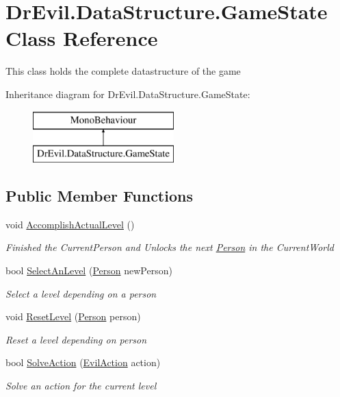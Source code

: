 \hypertarget{class_dr_evil_1_1_data_structure_1_1_game_state}{}\section{Dr\+Evil.\+Data\+Structure.\+Game\+State Class Reference}
\label{class_dr_evil_1_1_data_structure_1_1_game_state}


This class holds the complete datastructure of the game  


Inheritance diagram for Dr\+Evil.\+Data\+Structure.\+Game\+State\+:\begin{figure}[H]
\begin{center}
\leavevmode
\includegraphics[height=2.000000cm]{class_dr_evil_1_1_data_structure_1_1_game_state}
\end{center}
\end{figure}
\subsection*{Public Member Functions}
\begin{DoxyCompactItemize}
\item 
void \mbox{\hyperlink{class_dr_evil_1_1_data_structure_1_1_game_state_aefeb7ac3d896bc342f85fdd807ab5c82}{Accomplish\+Actual\+Level}} ()
\begin{DoxyCompactList}\small\item\em Finished the Current\+Person and Unlocks the next \mbox{\hyperlink{class_person}{Person}} in the Current\+World \end{DoxyCompactList}\item 
bool \mbox{\hyperlink{class_dr_evil_1_1_data_structure_1_1_game_state_a04198d05c739adf93c35fcfa7aab340a}{Select\+An\+Level}} (\mbox{\hyperlink{class_person}{Person}} new\+Person)
\begin{DoxyCompactList}\small\item\em Select a level depending on a person \end{DoxyCompactList}\item 
void \mbox{\hyperlink{class_dr_evil_1_1_data_structure_1_1_game_state_ac34f35978eeba7de0ba96b018b8216c4}{Reset\+Level}} (\mbox{\hyperlink{class_person}{Person}} person)
\begin{DoxyCompactList}\small\item\em Reset a level depending on person \end{DoxyCompactList}\item 
bool \mbox{\hyperlink{class_dr_evil_1_1_data_structure_1_1_game_state_a5d26d915d3a81df99b17402e49491a80}{Solve\+Action}} (\mbox{\hyperlink{class_evil_action}{Evil\+Action}} action)
\begin{DoxyCompactList}\small\item\em Solve an action for the current level \end{DoxyCompactList}\end{DoxyCompactItemize}
